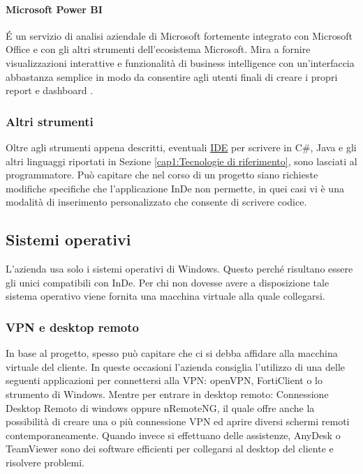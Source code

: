 \paragraph{Microsoft Power BI}
\'E un servizio di analisi aziendale di Microsoft fortemente integrato con Microsoft Office e con gli altri strumenti dell'ecosistema Microsoft. Mira a fornire visualizzazioni interattive e funzionalità di business intelligence con un'interfaccia abbastanza semplice in modo da consentire agli utenti finali di creare i propri report e dashboard \cite{[10]}.

\subsubsection*{Altri strumenti}
Oltre agli strumenti appena descritti, eventuali \hyperref[IDE]{IDE} per scrivere in C\#, Java e gli altri linguaggi riportati in Sezione \ref{cap1:Tecnologie di riferimento}, sono lasciati al programmatore. Può capitare che nel corso di un progetto siano richieste  modifiche specifiche che l'applicazione InDe non permette, in quei casi vi è una modalità di inserimento personalizzato che consente di scrivere codice.



\subsection{Sistemi operativi}
\label{cap1:Sistemi operativi}

L'azienda usa  solo i sistemi operativi di Windows. Questo perché risultano essere gli unici compatibili con InDe. Per chi non dovesse avere a disposizione tale sistema operativo viene fornita una macchina virtuale alla quale collegarsi. 

\subsubsection*{VPN e desktop remoto}
In base al progetto, spesso può capitare che ci si debba affidare alla macchina virtuale del cliente. In queste occasioni l'azienda consiglia l'utilizzo di una delle seguenti applicazioni per connettersi alla VPN: openVPN, FortiClient o lo strumento di Windows. 
Mentre per entrare in desktop remoto: Connessione Desktop Remoto di windows oppure nRemoteNG, il quale offre anche la possibilità di creare una o più connessione VPN ed aprire diversi schermi remoti contemporaneamente. 
Quando invece si effettuano delle assistenze, AnyDesk o TeamViewer sono dei software efficienti per collegarsi al desktop del cliente e risolvere problemi.


